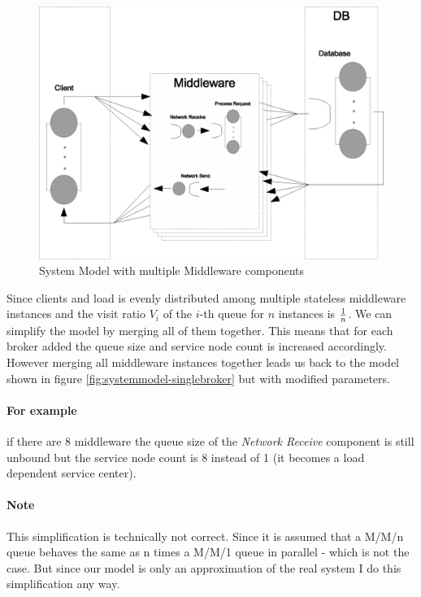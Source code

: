 \documentclass[a4paper]{article}
\begin{document}

\begin{figure}[H]
	\begin{center}
    \includegraphics[scale=0.6]{../drawings-ms2/systemmodel-multiplebroker.eps}
  \end{center}
  \caption{System Model with multiple Middleware components}
  \label{fig:systemmodel-multiplebroker}
\end{figure}


Since clients and load is evenly distributed among multiple stateless middleware instances and the visit ratio $V_i$ of the $i$-th queue for $n$ instances is $1 \over n$. We can simplify the model by merging all of them together. This means that for each broker added the queue size and service node count is increased accordingly. However merging all middleware instances together leads us back to the model shown in figure \ref{fig:systemmodel-singlebroker} but with modified parameters.

\paragraph{For example} if there are 8 middleware the queue size of the \textit{Network Receive} component is still unbound but the service node count is 8 instead of 1 (it becomes a load dependent service center).

\paragraph{Note} This simplification is technically not correct. Since it is assumed that a M/M/n queue behaves the same as n times a M/M/1 queue in parallel - which is not the case. But since our model is only an approximation of the real system I do this simplification any way.
\end{document}
